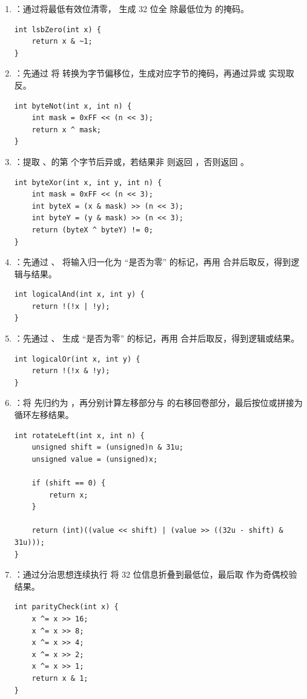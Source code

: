 \documentclass[12pt, a4paper]{academics}
\begin{document}
\begin{enumerate}
    \item {}：通过将最低有效位清零， 生成 32 位全  除最低位为  的掩码。
    \begin{verbatim}
int lsbZero(int x) {
    return x & ~1;
}
    \end{verbatim}

    \item {}：先通过  将  转换为字节偏移位，生成对应字节的掩码，再通过异或  实现取反。
    \begin{verbatim}
int byteNot(int x, int n) {
    int mask = 0xFF << (n << 3);
    return x ^ mask;
}
    \end{verbatim}

    \item {}：提取 、的第  个字节后异或，若结果非  则返回 ，否则返回 。
    \begin{verbatim}
int byteXor(int x, int y, int n) {
    int mask = 0xFF << (n << 3);
    int byteX = (x & mask) >> (n << 3);
    int byteY = (y & mask) >> (n << 3);
    return (byteX ^ byteY) != 0;
}
    \end{verbatim}

    \item {}：先通过 、 将输入归一化为 ``是否为零'' 的标记，再用 \mil[c]{|} 合并后取反，得到逻辑与结果。
    \begin{verbatim}
int logicalAnd(int x, int y) {
    return !(!x | !y);
}
    \end{verbatim}

    \item {}：先通过 、 生成 ``是否为零'' 的标记，再用 \mil[c]{&} 合并后取反，得到逻辑或结果。
    \begin{verbatim}
int logicalOr(int x, int y) {
    return !(!x & !y);
}
    \end{verbatim}

    \item {}：将  先归约为 ，再分别计算左移部分与  的右移回卷部分，最后按位或拼接为循环左移结果。
    \begin{verbatim}
int rotateLeft(int x, int n) {
    unsigned shift = (unsigned)n & 31u;
    unsigned value = (unsigned)x;

    if (shift == 0) {
        return x;
    }

    return (int)((value << shift) | (value >> ((32u - shift) & 31u)));
}
    \end{verbatim}

    \item {}：通过分治思想连续执行  将 32 位信息折叠到最低位，最后取  作为奇偶校验结果。
    \begin{verbatim}
int parityCheck(int x) {
    x ^= x >> 16;
    x ^= x >> 8;
    x ^= x >> 4;
    x ^= x >> 2;
    x ^= x >> 1;
    return x & 1;
}
    \end{verbatim}
\end{enumerate}
\end{document}
